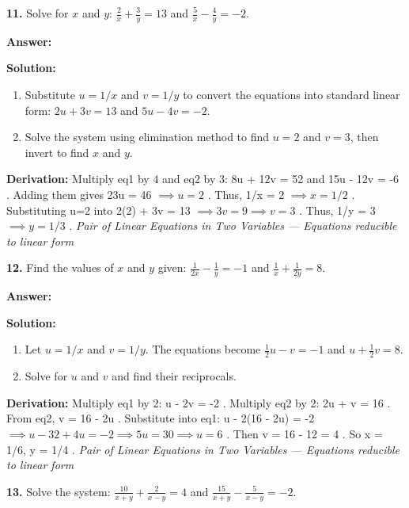 \documentclass[12pt,a4paper]{exam}
\newcommand{\fitmath}[1]{%
  \sbox{\schmathbox}{$\displaystyle #1$}%
  \ifdim\wd\schmathbox>\linewidth
    \resizebox{\linewidth}{!}{\usebox{\schmathbox}}%
  \else
    \usebox{\schmathbox}%
  \fi}
\begin{document}
\begin{questions}
\question \textbf{11.} Solve for $x$ and $y$: $\frac{2}{x} + \frac{3}{y} = 13$ and $\frac{5}{x} - \frac{4}{y} = -2$.

\textbf{Answer:}
\begin{center}
\fitmath{x = \frac{1}{2}, y = \frac{1}{3}}
\end{center}

\textbf{Solution:}
\begin{enumerate}
  \item Substitute $u = 1/x$ and $v = 1/y$ to convert the equations into standard linear form: $2u + 3v = 13$ and $5u - 4v = -2$.
  \item Solve the system using elimination method to find $u=2$ and $v=3$, then invert to find $x$ and $y$.
\end{enumerate}
\textbf{Derivation:}
Multiply eq1 by 4 and eq2 by 3:  8u + 12v = 52  and  15u - 12v = -6 . Adding them gives  23u = 46 $\implies u = 2$ . Thus,  1/x = 2 $\implies x = 1/2$ . Substituting  u=2  into  2(2) + 3v = 13 $\implies 3v = 9 \implies v = 3$ . Thus,  1/y = 3 $\implies y = 1/3$ .
\hfill \textit{Pair of Linear Equations in Two Variables — Equations reducible to linear form}
\vspace{0.3cm}

\question \textbf{12.} Find the values of $x$ and $y$ given: $\frac{1}{2x} - \frac{1}{y} = -1$ and $\frac{1}{x} + \frac{1}{2y} = 8$.

\textbf{Answer:}
\begin{center}
\fitmath{x = 1/6, y = 1/14}
\end{center}

\textbf{Solution:}
\begin{enumerate}
  \item Let $u = 1/x$ and $v = 1/y$. The equations become $\frac{1}{2}u - v = -1$ and $u + \frac{1}{2}v = 8$.
  \item Solve for $u$ and $v$ and find their reciprocals.
\end{enumerate}
\textbf{Derivation:}
Multiply eq1 by 2:  u - 2v = -2 . Multiply eq2 by 2:  2u + v = 16 . From eq2,  v = 16 - 2u . Substitute into eq1:  u - 2(16 - 2u) = -2 $\implies u - 32 + 4u = -2 \implies 5u = 30 \implies u = 6$ . Then  v = 16 - 12 = 4 . So  x = 1/6, y = 1/4 .
\hfill \textit{Pair of Linear Equations in Two Variables — Equations reducible to linear form}
\vspace{0.3cm}

\question \textbf{13.} Solve the system: $\frac{10}{x+y} + \frac{2}{x-y} = 4$ and $\frac{15}{x+y} - \frac{5}{x-y} = -2$.


\end{questions}
\end{document}
